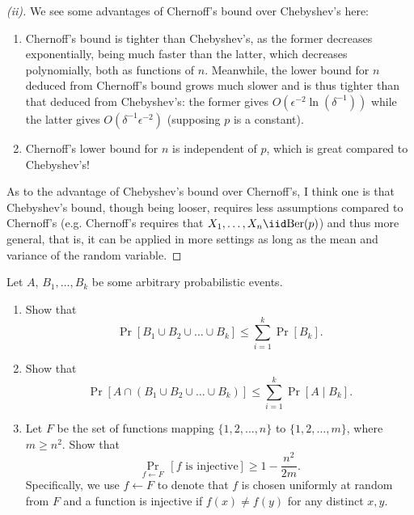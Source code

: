 \begin{proof}[(ii)]
    We see some advantages of Chernoff’s bound over Chebyshev’s here:
    \begin{enumerate}
        \item Chernoff’s bound is tighter than Chebyshev’s, as the former decreases exponentially, being much faster than the latter, which decreases polynomially, both as functions of $n$. Meanwhile, the lower bound for $n$ deduced from Chernoff’s bound grows much slower and is thus tighter than that deduced from Chebyshev’s: the former gives $O(\epsilon^{-2}\ln(\delta^{-1}))$ while the latter gives $O(\delta^{-1}\epsilon^{-2})$ (supposing $p$ is a constant).
        \item Chernoff’s lower bound for $n$ is independent of $p$, which is great compared to Chebyshev’s!
    \end{enumerate}
    As to the advantage of Chebyshev’s bound over Chernoff’s, I think one is that Chebyshev's bound, though being looser, requires less assumptions compared to Chernoff’s (e.g. Chernoff’s requires that $X_1,\ldots, X_n\iid \mathrm{Ber}(p)$) and thus more general, that is, it can be applied in more settings as long as the mean and variance of the random variable.
\end{proof}



\clearpage
{}

\begin{problem}\label{p3}
Let $A$, $B_1,\dots, B_k$ be some arbitrary probabilistic events.
\begin{enumerate}[label=(\roman*)]
\item Show that
    \begin{equation*}
        \Pr[ B_1\cup B_2\cup \dots \cup B_k] 
		\leq  \sum\limits_{i=1}^k \Pr[B_k].
    \end{equation*}
\item  Show that
    \begin{equation*}
        \Pr[ A \cap (B_1 \cup B_2\cup\dots\cup B_k)] 
		\leq  \sum\limits_{i=1}^k \Pr[A \mid B_k ].
    \end{equation*}
\item Let $F$ be the set of functions mapping $\{1,2,\dots,n\}$ to $\{1,2,\dots,m\}$, where $m \geq n^2$. Show that
\begin{equation*}
        \Pr\limits_{f \leftarrow F}\,[f \text{ is injective}] 
		\geq 1-\frac{n^2}{2m} .
    \end{equation*}
Specifically, we use $f \leftarrow F$ to denote that $f$ is chosen uniformly at random from $F$ and a function is injective if $f(x)\neq f(y)$ for any distinct $x,y$.
\end{enumerate}
\end{problem}

